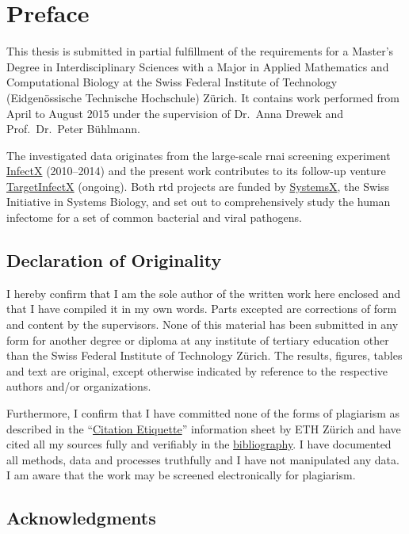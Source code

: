 \chapter{Preface}

This thesis is submitted in partial fulfillment of the requirements for a Master's Degree in Interdisciplinary Sciences with a Major in Applied Mathematics and Computational Biology at the Swiss Federal Institute of Technology (Eidgenössische Technische Hochschule) Z\"urich. It contains work performed from April to August 2015 under the supervision of Dr.\ Anna Drewek and Prof.\ Dr.\ Peter B\"uhlmann.

The investigated data originates from the large-scale \acrfull{rnai} screening experiment \href{http://www.infectx.ch}{InfectX} (2010--2014) and the present work contributes to its follow-up venture \href{http://www.targetinfectx.ch}{TargetInfectX} (ongoing). Both \acrfull{rtd} projects are funded by \href{http://www.systemsx.ch}{SystemsX}, the Swiss Initiative in Systems Biology, and set out to comprehensively study the human infectome for a set of common bacterial and viral pathogens.

\section*{Declaration of Originality}

I hereby confirm that I am the sole author of the written work here enclosed and that I have compiled it in my own words. Parts excepted are corrections of form and content by the supervisors. None of this material has been submitted in any form for another degree or diploma at any institute of tertiary education other than the Swiss Federal Institute of Technology Z\"urich. The results, figures, tables and text are original, except otherwise indicated by reference to the respective authors and/or organizations.

Furthermore, I confirm that I have committed none of the forms of plagiarism as described in the ``\href{https://www.ethz.ch/content/dam/ethz/main/education/rechtliches-abschluesse/leistungskontrollen/plagiarism-citationetiquette.pdf}{Citation Etiquette}'' information sheet by ETH Z\"urich and have cited all my sources fully and verifiably in the \hyperref[ch:bibliography]{bibliography}. I have documented all methods, data and processes truthfully and I have not manipulated any data. I am aware that the work may be screened electronically for plagiarism.

\section*{Acknowledgments}

